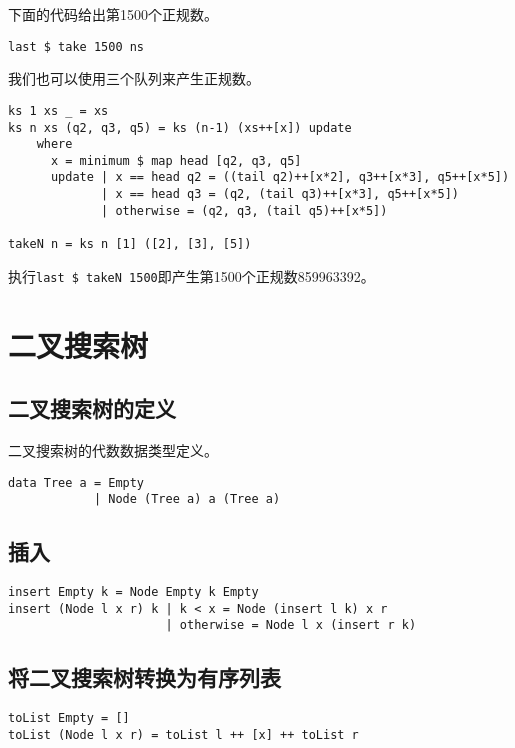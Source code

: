 \documentclass{ctexart}
\begin{document}
下面的代码给出第1500个正规数。
\begin{verbatim}
last $ take 1500 ns
\end{verbatim}

我们也可以使用三个队列来产生正规数。

\begin{lstlisting}
ks 1 xs _ = xs
ks n xs (q2, q3, q5) = ks (n-1) (xs++[x]) update
    where
      x = minimum $ map head [q2, q3, q5]
      update | x == head q2 = ((tail q2)++[x*2], q3++[x*3], q5++[x*5])
             | x == head q3 = (q2, (tail q3)++[x*3], q5++[x*5])
             | otherwise = (q2, q3, (tail q5)++[x*5])

takeN n = ks n [1] ([2], [3], [5])
\end{lstlisting}

执行\texttt{last \$ takeN 1500}即产生第1500个正规数859963392。

\section{二叉搜索树}

\subsection{二叉搜索树的定义}

二叉搜索树的代数数据类型定义。

\begin{lstlisting}
data Tree a = Empty
            | Node (Tree a) a (Tree a)
\end{lstlisting}

\subsection{插入}

\begin{lstlisting}
insert Empty k = Node Empty k Empty
insert (Node l x r) k | k < x = Node (insert l k) x r
                      | otherwise = Node l x (insert r k)
\end{lstlisting}

\subsection{将二叉搜索树转换为有序列表}

\begin{lstlisting}
toList Empty = []
toList (Node l x r) = toList l ++ [x] ++ toList r
\end{lstlisting}
\end{document}
